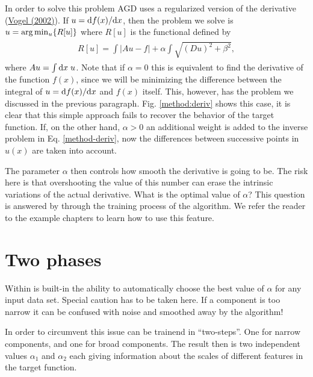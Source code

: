 \documentclass[letterpaper,10pt,openany,oneside]{sphinxmanual}
\begin{document}
In order to solve this problem AGD uses a regularized version of the
derivative (\href{http://www.amazon.com/Computational-Methods-Problems-Frontiers-Mathematics/dp/0898715075}{Vogel (2002)}). If
\(u = {\rm d}f(x)/{\rm d}x\), then the problem we solve is
\(u = {\rm arg}\min_u\{R[u]\}\) where \(R[u]\) is the
functional defined by
\label{method:equation-deriv}\begin{gather}
\begin{split}R[u] = \int | A u - f | + \alpha \int \sqrt{(Du)^2 +
       \beta^2},\end{split}\label{method-deriv}
\end{gather}
where \(A u = \int {\rm d}x\; u\). Note that if \(\alpha=0\)
this is equivalent to find the derivative of the function
\(f(x)\), since we will be minimizing the difference between the
integral of \(u = {\rm d}f(x)/{\rm d}x\) and \(f(x)\)
itself. This, however, has the problem we discussed in the previous
paragraph. Fig. \hyperref[method:deriv]{ \ref*{method:deriv}} shows this case, it is clear that this
simple approach fails to recover the behavior of the target
function. If, on the other hand, \(\alpha > 0\) an additional
weight is added to the inverse problem in Eq. \eqref{method-deriv}, now the
differences between successive points in \(u(x)\) are taken into
account.

The parameter \(\alpha\) then controls how smooth the derivative
is going to be. The risk here is that overshooting the value of this
number can erase the intrinsic variations of the actual
derivative. What is the optimal value of \(\alpha\)? This question
is answered by  through the training process of the
algorithm. We refer the reader to the example chapters to learn how to
use this feature.


\section{Two phases}
\label{method:two-phases}
Within  is built-in the ability to automatically choose the
best value of \(\alpha\) for any input data set. Special caution
has to be taken here. If a component is too narrow it can be confused
with noise and smoothed away by the algorithm!

In order to circumvent this issue  can be trainend in
``two-steps''. One for narrow components, and one for broad
components. The result then is two independent values \(\alpha_1\)
and \(\alpha_2\) each giving information about the scales of
different features in the target function.
\end{document}
